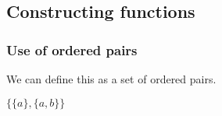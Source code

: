 
\subsection{Constructing functions}

\subsubsection{Use of ordered pairs}

We can define this as a set of ordered pairs.

\(\{\{a\},\{a,b\}\}\)

